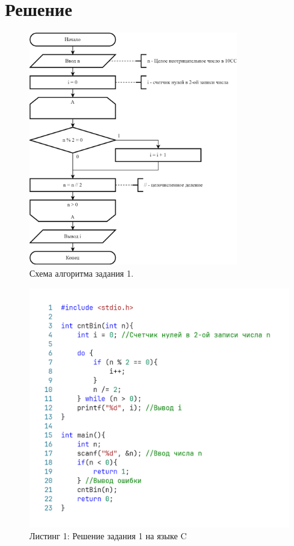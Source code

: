 \documentclass[oneside,a4paper,14pt]{extarticle} %
\begin{document}
\section*{Решение}
\begin{figure}[h!]
	\centering
	\includegraphics[width=0.8\textwidth]{pics/1-flowchart.png}
	\caption{Схема алгоритма задания 1.}
\end{figure}
\newpage
\begin{figure}[h!]
	\centering
	\includegraphics[width=1\textwidth]{pics/1-listing.png}
	\caption*{Листинг 1: Решение задания 1 на языке C}
\end{figure}
\end{document}
